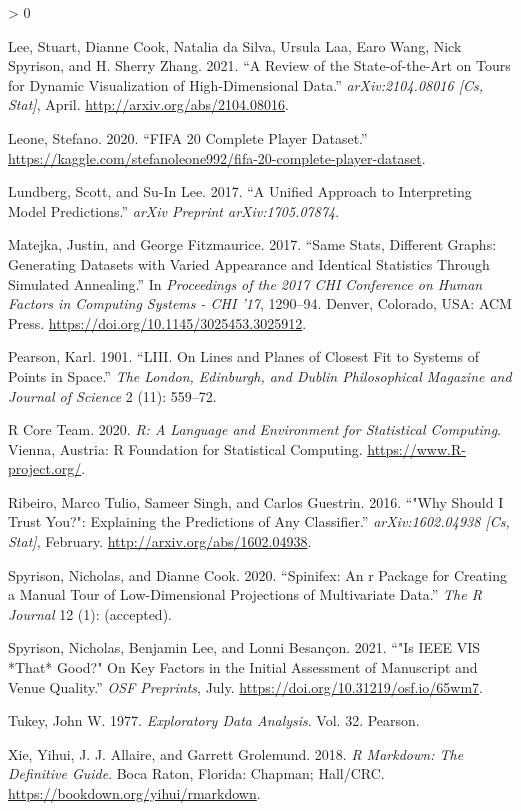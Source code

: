 \documentclass[
  11,
]{article}
\newlength{\cslhangindent}
\newenvironment{CSLReferences}[2] %
 {%
  \setlength{\parindent}{0pt}
  \ifodd #1 \everypar{\setlength{\hangindent}{\cslhangindent}}\ignorespaces\fi
  \ifnum #2 > 0
  \setlength{\parskip}{#2\baselineskip}
  \fi
 }%
 {}
\begin{document}
\begin{CSLReferences}{1}{0}
\leavevmode\hypertarget{ref-lee_review_2021}{}%
Lee, Stuart, Dianne Cook, Natalia da Silva, Ursula Laa, Earo Wang, Nick Spyrison, and H. Sherry Zhang. 2021. {``A {Review} of the {State}-of-the-{Art} on {Tours} for {Dynamic} {Visualization} of {High}-{Dimensional} {Data}.''} \emph{arXiv:2104.08016 {[}Cs, Stat{]}}, April. \url{http://arxiv.org/abs/2104.08016}.

\leavevmode\hypertarget{ref-leone_fifa_2020}{}%
Leone, Stefano. 2020. {``{FIFA} 20 Complete Player Dataset.''} \url{https://kaggle.com/stefanoleone992/fifa-20-complete-player-dataset}.

\leavevmode\hypertarget{ref-lundberg_unified_2017}{}%
Lundberg, Scott, and Su-In Lee. 2017. {``A Unified Approach to Interpreting Model Predictions.''} \emph{arXiv Preprint arXiv:1705.07874}.

\leavevmode\hypertarget{ref-matejka_same_2017}{}%
Matejka, Justin, and George Fitzmaurice. 2017. {``Same Stats, Different Graphs: Generating Datasets with Varied Appearance and Identical Statistics Through Simulated Annealing.''} In \emph{Proceedings of the 2017 {CHI} Conference on Human Factors in Computing Systems - {CHI} '17}, 1290--94. Denver, Colorado, {USA}: {ACM} Press. \url{https://doi.org/10.1145/3025453.3025912}.

\leavevmode\hypertarget{ref-pearson_liii._1901}{}%
Pearson, Karl. 1901. {``{LIII}. On Lines and Planes of Closest Fit to Systems of Points in Space.''} \emph{The London, Edinburgh, and Dublin Philosophical Magazine and Journal of Science} 2 (11): 559--72.

\leavevmode\hypertarget{ref-r_core_team_r:_2020}{}%
R Core Team. 2020. \emph{R: {A} {Language} and {Environment} for {Statistical} {Computing}}. Vienna, Austria: R Foundation for Statistical Computing. \url{https://www.R-project.org/}.

\leavevmode\hypertarget{ref-ribeiro_why_2016}{}%
Ribeiro, Marco Tulio, Sameer Singh, and Carlos Guestrin. 2016. {``"{Why} {Should} {I} {Trust} {You}?": {Explaining} the {Predictions} of {Any} {Classifier}.''} \emph{arXiv:1602.04938 {[}Cs, Stat{]}}, February. \url{http://arxiv.org/abs/1602.04938}.

\leavevmode\hypertarget{ref-spyrison_spinifex_2020}{}%
Spyrison, Nicholas, and Dianne Cook. 2020. {``Spinifex: An r Package for Creating a Manual Tour of Low-Dimensional Projections of Multivariate Data.''} \emph{The R Journal} 12 (1): (accepted).

\leavevmode\hypertarget{ref-spyrison_is_2021}{}%
Spyrison, Nicholas, Benjamin Lee, and Lonni Besançon. 2021. {``"{Is} {IEEE} {VIS} *That* Good?" {On} Key Factors in the Initial Assessment of Manuscript and Venue Quality.''} \emph{OSF Preprints}, July. \url{https://doi.org/10.31219/osf.io/65wm7}.

\leavevmode\hypertarget{ref-tukey_exploratory_1977}{}%
Tukey, John W. 1977. \emph{Exploratory Data Analysis}. Vol. 32. Pearson.

\leavevmode\hypertarget{ref-xie_r_2018}{}%
Xie, Yihui, J. J. Allaire, and Garrett Grolemund. 2018. \emph{R Markdown: The Definitive Guide}. Boca Raton, Florida: Chapman; Hall/{CRC}. \url{https://bookdown.org/yihui/rmarkdown}.

\end{CSLReferences}
\end{document}

